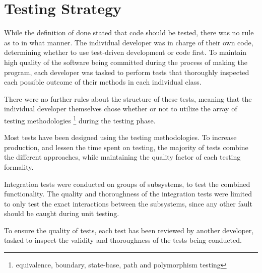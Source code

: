 \chapter{Testing Strategy}
	
	While the definition of done stated that code should be tested, there was no rule as to in what manner. The individual developer was in charge of their own code, determining whether to use test-driven development or code first.
	To maintain high quality of the software being committed during the process of making the program, each developer was tasked to perform tests that thoroughly inspected each possible outcome of their methods in each individual class.
	
	There were no further rules about the structure of these tests, meaning that the individual developer themselves chose whether or not to utilize the array of testing methodologies \footnote{equivalence, boundary, state-base, path and polymorphism testing} during the testing phase.
	
	Most tests have been designed using the testing methodologies. To increase production, and lessen the time spent on testing, the majority of tests combine the different approaches, while maintaining the quality factor of each testing formality.

	Integration tests were conducted on groups of subsystems, to test the combined functionality. The quality and thoroughness of the integration tests were limited to only test the exact interactions between the subsystems, since any other fault should be caught during unit testing.
	
	To ensure the quality of tests, each test has been reviewed by another developer, tasked to inspect the validity and thoroughness of the tests being conducted.